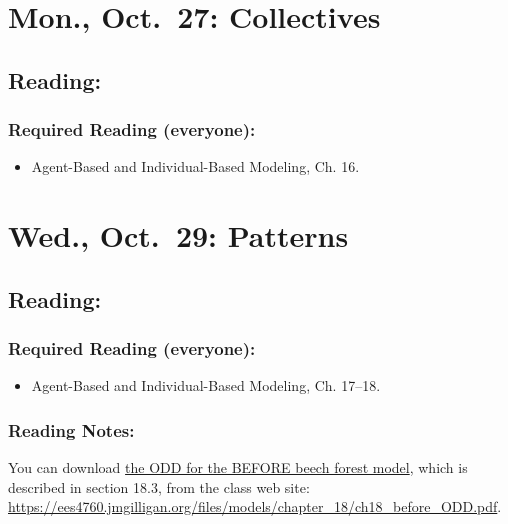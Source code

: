 \documentclass[
]{article}
\providecommand{\tightlist}{%
  \setlength{\itemsep}{0pt}\setlength{\parskip}{0pt}}
\begin{document}
\section{Mon., Oct.~27: Collectives}\label{mon.-oct.-27-collectives}

\subsection{Reading:}\label{reading-18}

\subsubsection{Required Reading
(everyone):}\label{required-reading-everyone-15}

\begin{itemize}
\tightlist
\item
  Agent-Based and Individual-Based Modeling, Ch. 16.
\end{itemize}

\section{Wed., Oct.~29: Patterns}\label{wed.-oct.-29-patterns}

\subsection{Reading:}\label{reading-19}

\subsubsection{Required Reading
(everyone):}\label{required-reading-everyone-16}

\begin{itemize}
\tightlist
\item
  Agent-Based and Individual-Based Modeling, Ch. 17--18.
\end{itemize}

\subsubsection{Reading Notes:}\label{reading-notes-14}

You can download \href{/files/models/chapter_18/ch18_before_ODD.pdf}{the
ODD for the BEFORE beech forest model}, which is described in section
18.3, from the class web site:
\url{https://ees4760.jmgilligan.org/files/models/chapter_18/ch18_before_ODD.pdf}.
\end{document}

